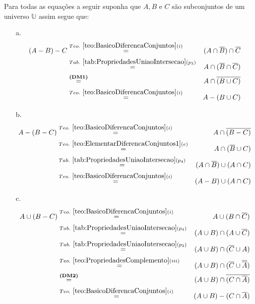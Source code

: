 \begin{prova}
  Para todas as equações a seguir suponha que $A, B$ e $C$ são subconjuntos de um universo $\mathbb{U}$ assim segue que:
  \begin{itemize}
		\item[a.]
		\begin{eqnarray*}
			(A - B) - C & \stackrel{Teo. \  \ref{teo:BasicoDiferencaConjuntos}(i)}{=} & (A \cap \overline{B}) \cap \overline{C}\\
			& \stackrel{Tab. \ \ref{tab:PropriedadesUniaoIntersecao}(p_3)}{=} & A \cap (\overline{B} \cap \overline{C})\\
			& \stackrel{\textbf{(DM1)}}{=} & A \cap \overline{(B \cup C)}\\
			& \stackrel{Teo. \  \ref{teo:BasicoDiferencaConjuntos}(i)}{=} & A - (B \cup C)
		\end{eqnarray*}
		\item[b.]
		\begin{eqnarray*}
			A - (B - C) & \stackrel{Teo. \  \ref{teo:BasicoDiferencaConjuntos}(i)}{=} & A \cap \overline{(B - C)} \\
			& \stackrel{Teo. \ \ref{teo:ElementarDiferencaConjuntos1}(e)}{=} & A \cap (\overline{B} \cup C)\\
			& \stackrel{Tab. \ \ref{tab:PropriedadesUniaoIntersecao}(p_4)}{=} & (A \cap \overline{B}) \cup (A \cap C)\\
			& \stackrel{Teo. \  \ref{teo:BasicoDiferencaConjuntos}(i)}{=} & (A - B) \cup (A \cap C)
		\end{eqnarray*}
		\item[c.]
		\begin{eqnarray*}
			A \cup (B - C) & \stackrel{Teo. \  \ref{teo:BasicoDiferencaConjuntos}(i)}{=} & A \cup (B \cap \overline{C})\\
			& \stackrel{Tab. \ \ref{tab:PropriedadesUniaoIntersecao}(p_4)}{=} &  (A \cup B) \cap (A \cup \overline{C})\\
			& \stackrel{Tab. \ \ref{tab:PropriedadesUniaoIntersecao}(p_2)}{=} & (A \cup B) \cap (\overline{C} \cup A)\\
			& \stackrel{Teo. \ \ref{teo:PropriedadesComplemento}(iii)}{=}& (A \cup B) \cap (\overline{C} \cup \overline{\overline{A}})\\
			& \stackrel{\textbf{(DM2)}}{=}& (A \cup B) \cap \overline{(C \cap \overline{A})}\\
			& \stackrel{Teo. \  \ref{teo:BasicoDiferencaConjuntos}(i)}{=}& (A \cup B) - (C \cap \overline{A})\\

\end{eqnarray*}
\end{itemize}
\end{prova}
